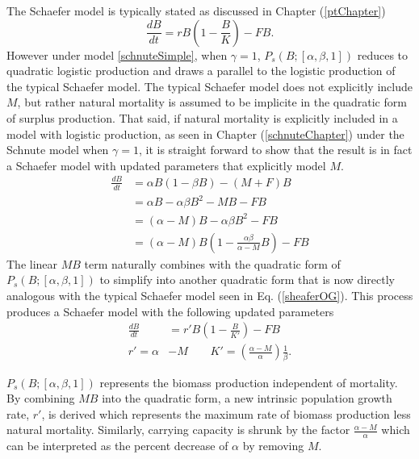 The Schaefer model is typically stated as discussed in Chapter (\ref{ptChapter})
\begin{equation}
\frac{dB}{dt} = r B \left(1-\frac{B}{K}\right) - FB. \label{sheaferOG}
\end{equation}
However under model \ref{schnuteSimple}, when $\gamma=1$, 
$P_s(B;[\alpha, \beta, 1])$ reduces to quadratic logistic production and 
draws a parallel to the logistic production of the typical Schaefer model. 
The typical Schaefer model does not explicitly include $M$, but rather natural 
mortality is assumed to be implicite in the quadratic form of surplus production. 
That said, if natural mortality is explicitly included in a model with logistic 
production, as seen in Chapter (\ref{schnuteChapter}) under the Schnute model 
when $\gamma=1$, it is straight forward to show that the result is in fact a 
Schaefer model with updated parameters that explicitly model $M$. 
\begin{align}
\frac{dB}{dt} &= \alpha B \left(1-\beta B\right) - (M+F)B \nonumber\\%
&= \alpha B -\alpha\beta B^2 - M B - F B \nonumber\\
&= (\alpha-M)B -\alpha\beta B^2 - F B \nonumber\\
&= (\alpha-M)B \left(1 - \frac{\alpha\beta}{\alpha-M}B\right) - F B
\end{align}
The linear $MB$ term naturally combines with the quadratic form of 
$P_s(B;[\alpha, \beta, 1])$ to simplify into another quadratic 
form that is now directly analogous with the typical Schaefer model seen in 
Eq. (\ref{sheaferOG}). This process produces a Schaefer model with 
the following updated parameters
\begin{align}
\frac{dB}{dt} &= r' B \left(1-\frac{B}{K'}\right) - FB\\
r'=\alpha&-M ~~~~~~~~~ K'=\left(\frac{\alpha-M}{\alpha}\right)\frac{1}{\beta}.
\end{align}
%
%  

$P_s(B;[\alpha, \beta, 1])$ represents the biomass production independent of 
mortality. By combining $MB$ into the quadratic form, a new intrinsic 
population growth rate, $r'$, is derived which represents the maximum rate of 
biomass production less natural mortality. %
Similarly, 
carrying capacity is shrunk by the factor $\frac{\alpha-M}{\alpha}$ 
which can be interpreted as the percent decrease of $\alpha$ by removing $M$.

